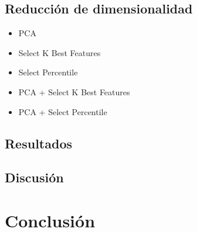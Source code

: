 \documentclass[a4paper]{article}
\begin{document}
\subsection{Reducción de dimensionalidad}

\begin{itemize}
	\item PCA
	\item Select K Best Features
	\item Select Percentile
	\item PCA + Select K Best Features
	\item PCA + Select Percentile
\end{itemize}


\subsection{Resultados}

\subsection{Discusión}

\section{Conclusión}
\end{document}
